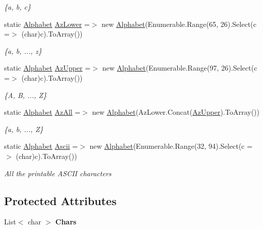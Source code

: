 \begin{DoxyCompactItemize}
\begin{DoxyCompactList}\small\item\em \{a, b, c\} \end{DoxyCompactList}\item 
static \mbox{\hyperlink{class_system_1_1_automata_1_1_alphabet}{Alphabet}} \mbox{\hyperlink{class_system_1_1_automata_1_1_alphabet_a6962b8539b792f5b1c00401f45894b58}{Az\+Lower}} =$>$ new \mbox{\hyperlink{class_system_1_1_automata_1_1_alphabet}{Alphabet}}(Enumerable.\+Range(65, 26).Select(c =$>$ (char)c).To\+Array())
\begin{DoxyCompactList}\small\item\em \{a, b, ..., z\} \end{DoxyCompactList}\item 
static \mbox{\hyperlink{class_system_1_1_automata_1_1_alphabet}{Alphabet}} \mbox{\hyperlink{class_system_1_1_automata_1_1_alphabet_ac1b4eaec3c00e63dab2d176773ec84f1}{Az\+Upper}} =$>$ new \mbox{\hyperlink{class_system_1_1_automata_1_1_alphabet}{Alphabet}}(Enumerable.\+Range(97, 26).Select(c =$>$ (char)c).To\+Array())
\begin{DoxyCompactList}\small\item\em \{A, B, ..., Z\} \end{DoxyCompactList}\item 
static \mbox{\hyperlink{class_system_1_1_automata_1_1_alphabet}{Alphabet}} \mbox{\hyperlink{class_system_1_1_automata_1_1_alphabet_a090b19b9683fc56693e032edf961313f}{Az\+All}} =$>$ new \mbox{\hyperlink{class_system_1_1_automata_1_1_alphabet}{Alphabet}}(Az\+Lower.\+Concat(\mbox{\hyperlink{class_system_1_1_automata_1_1_alphabet_ac1b4eaec3c00e63dab2d176773ec84f1}{Az\+Upper}}).To\+Array())
\begin{DoxyCompactList}\small\item\em \{a, b, ..., Z\} \end{DoxyCompactList}\item 
static \mbox{\hyperlink{class_system_1_1_automata_1_1_alphabet}{Alphabet}} \mbox{\hyperlink{class_system_1_1_automata_1_1_alphabet_a8876c9767b18e483848a0f4bc4de2cef}{Ascii}} =$>$ new \mbox{\hyperlink{class_system_1_1_automata_1_1_alphabet}{Alphabet}}(Enumerable.\+Range(32, 94).Select(c =$>$ (char)c).To\+Array())
\begin{DoxyCompactList}\small\item\em All the printable A\+S\+C\+II characters \end{DoxyCompactList}\end{DoxyCompactItemize}
\subsection*{Protected Attributes}
\begin{DoxyCompactItemize}
\item 
\mbox{\label{class_system_1_1_automata_1_1_alphabet_af772a1899e075c880b75bdc12e4fc766}} 
List$<$ char $>$ {\bfseries Chars}
\end{DoxyCompactItemize}


